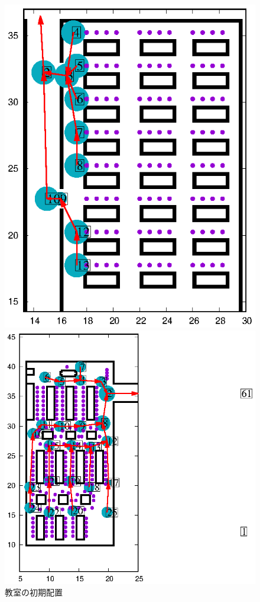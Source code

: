 \begin{figure}[tb]
	\begin{minipage}[b]{0.5\columnwidth}
		\centering
		\includegraphics[width=\columnwidth]{figure/kyositu_v2.eps}
		\caption{教室の初期配置}
    \label{fig:kyositu_haichi}
	\end{minipage}
	\begin{minipage}[b]{0.5\columnwidth}
		\centering
		\includegraphics[width=\columnwidth]{figure/pc_m.eps}

\end{minipage}
\end{figure}
